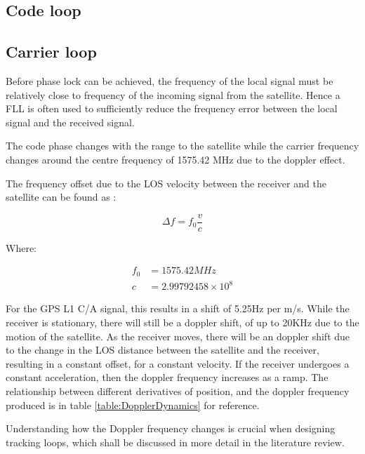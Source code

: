 \subsection{Code loop}

\subsection{Carrier loop}


Before phase lock can be achieved, the frequency of the local signal must be relatively close to frequency of the incoming signal from the satellite. Hence a \ac{FLL} is often used to sufficiently reduce the frequency error between the local signal and the received signal.

The code phase changes with the range to the satellite while the carrier frequency changes around the centre frequency of 1575.42 MHz due to the doppler effect\cite{Tsui}.

The frequency offset due to the \ac{LOS} velocity between the receiver and the satellite can be found as : 

\begin{equation}
\Delta f = f_0\frac{v}{c}
\end{equation}

Where: 
\begin{framed}
\begin{align*}
f_0 &= 1575.42 MHz\\   
c &= 2.99792458 \times 10^8
\end{align*}
\end{framed}

For the GPS L1 \ac{C/A} signal, this results in a shift of 5.25Hz per m/s. 
While the receiver is stationary, there will still be a doppler shift, of up to 20KHz due to the motion of the satellite\cite{Kaplan}. As the receiver moves, there will be an doppler shift due to the change in the \ac{LOS} distance between the satellite and the receiver, resulting in a constant offset, for a constant velocity. If the receiver undergoes a constant acceleration, then the doppler frequency increases as a ramp. The relationship between different derivatives of position, and the doppler frequency produced is in table \ref{table:DopplerDynamics} for reference.

Understanding how the Doppler frequency changes is crucial when designing tracking loops, which shall be discussed in more detail in the literature review. 

